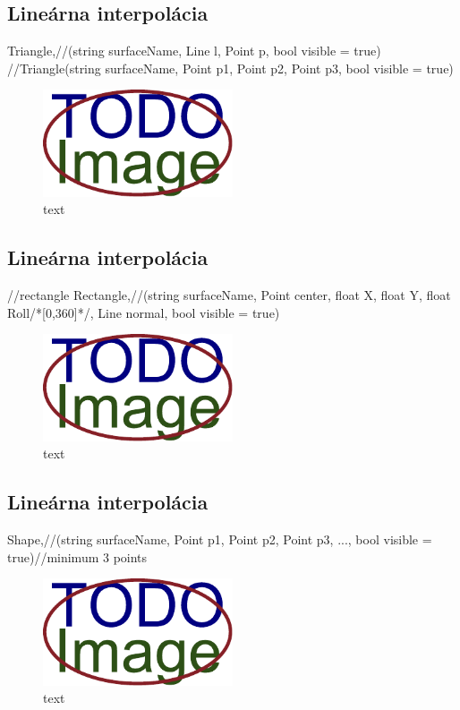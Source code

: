 \subsection{Lineárna interpolácia}
	Triangle,//(string surfaceName, Line l, Point p, bool visible = true)
	//Triangle(string surfaceName, Point p1, Point p2, Point p3, bool visible = true)

\begin{figure}[H]
	\centering
	\includegraphics[width=0.5\textwidth]{obrazky-figures/placeholder.pdf}
	\caption{text}
	\label{fig:1}
\end{figure}


\subsection{Lineárna interpolácia}
	//rectangle
	Rectangle,//(string surfaceName, Point center, float X, float Y, float Roll/*[0,360]*/, Line normal, bool visible = true)

\begin{figure}[H]
	\centering
	\includegraphics[width=0.5\textwidth]{obrazky-figures/placeholder.pdf}
	\caption{text}
	\label{fig:1}
\end{figure}


\subsection{Lineárna interpolácia}
	Shape,//(string surfaceName, Point p1, Point p2, Point p3, ..., bool visible = true)//minimum 3 points 

\begin{figure}[H]
	\centering
	\includegraphics[width=0.5\textwidth]{obrazky-figures/placeholder.pdf}
	\caption{text}
	\label{fig:1}
\end{figure}



